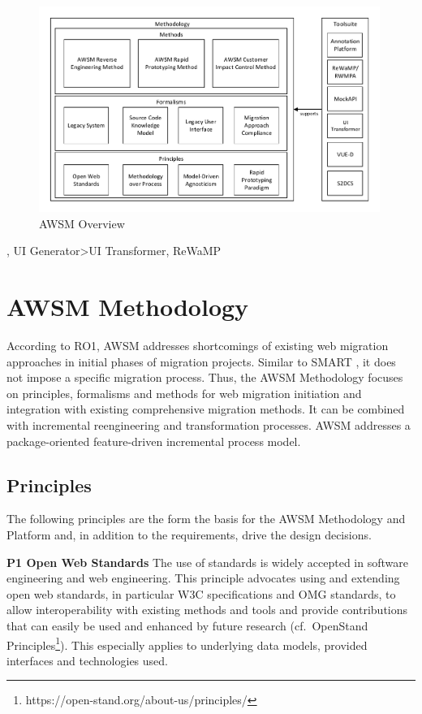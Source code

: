 \begin{figure}
\hypertarget{fig:solution}{%
\centering
\includegraphics[width=0.99\textwidth]{../figures/solution.pdf}
\caption{AWSM Overview}\label{fig:solution}
}
\end{figure}

, UI Generator\textgreater UI Transformer, ReWaMP

\hypertarget{awsm-methodology}{%
\section{AWSM Methodology}\label{awsm-methodology}}

According to RO1, AWSM addresses shortcomings of existing web migration approaches in initial phases of migration projects.
Similar to SMART \autocite{Lewis2008SMART,Lewis2005SMART}, it does not impose a specific migration process.
Thus, the AWSM Methodology focuses on principles, formalisms and methods for web migration initiation and integration with existing comprehensive migration methods.
It can be combined with incremental reengineering and transformation processes.
AWSM addresses a package-oriented \autocite{Brodie1995Migrating} feature-driven \autocite{Menychtas2014ARTISTJournal} incremental process model.

\hypertarget{principles}{%
\subsection{Principles}\label{principles}}

The following principles are the form the basis for the AWSM Methodology and Platform and, in addition to the requirements, drive the design decisions.

\textbf{P1 Open Web Standards} The use of standards is widely accepted in software engineering and web engineering.
This principle advocates using and extending open web standards, in particular W3C specifications and OMG standards, to allow interoperability with existing methods and tools and provide contributions that can easily be used and enhanced by future research (cf.~OpenStand Principles\footnote{https://open-stand.org/about-us/principles/}).
This especially applies to underlying data models, provided interfaces and technologies used.

